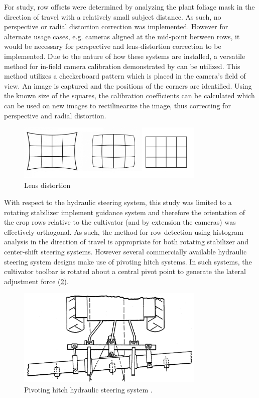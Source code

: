 \documentclass[authoryear]{elsarticle}
\begin{document}
For study, row offsets were determined by analyzing the
plant foliage mask in the direction of travel with a relatively small
subject distance. As such, no perspective or radial distortion correction was
implemented. However for alternate usage cases, e.g. cameras aligned
at the mid-point between rows, it would be necessary for perspective
and lens-distortion correction to be implemented. Due to the nature of
how these systems are installed, a versatile method for in-field
camera calibration demonstrated by \citet{lee2009} can be
utilized. This method utilizes a checkerboard pattern which is placed
in the camera’s field of view. An image is captured and the positions
of the corners are identified. Using the known size of the squares,
the calibration coefficients can be calculated which can be used on
new images to rectilinearize the image, thus correcting for
perspective and radial distortion.

\begin{figure}
  \centering
  \includegraphics[width=0.8\textwidth,natwidth=610,natheight=642]{lens_distortion.jpg}
  \caption{Lens distortion}
  \label{fig:distortion}
\end{figure}

With respect to the hydraulic steering system, this study was limited
to a rotating stabilizer implement guidance system
and therefore the orientation of the crop rows relative to the
cultivator (and by extension the cameras) was effectively
orthogonal. As such, the method for row detection using histogram
analysis in the direction of travel is appropriate for both rotating
stabilizer and center-shift steering systems. However several
commercially available hydraulic steering system designs make use of
pivoting hitch systems. In such systems, the cultivator toolbar is
rotated about a central pivot point to generate the lateral adjustment
force (\ref{fig:pivoting_hitch}).

\begin{figure}
  \centering
  \includegraphics[width=0.8\textwidth,natwidth=610,natheight=642]{pivoting_hitch.png}
  \caption{Pivoting hitch hydraulic steering system \citep{fleischer1990}.}
  \label{fig:pivoting_hitch}
\end{figure}
\end{document}
